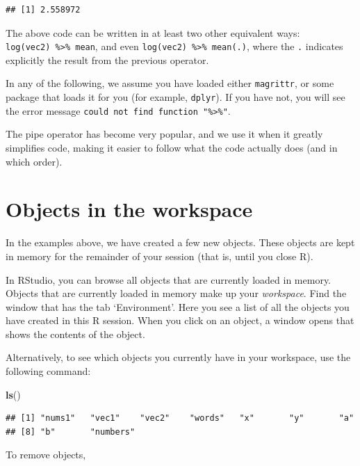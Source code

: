 \documentclass[]{book}
\newenvironment{Shaded}{\begin{snugshade}}{\end{snugshade}}
\newcommand{\KeywordTok}[1]{\textcolor[rgb]{0.13,0.29,0.53}{\textbf{#1}}}
\newcommand{\NormalTok}[1]{#1}
\begin{document}
\begin{verbatim}
## [1] 2.558972
\end{verbatim}

The above code can be written in at least two other equivalent ways: \texttt{log(vec2)\ \%\textgreater{}\%\ mean}, and even \texttt{log(vec2)\ \%\textgreater{}\%\ mean(.)}, where the \texttt{.} indicates explicitly the result from the previous operator.

In any of the following, we assume you have loaded either \texttt{magrittr}, or some package that loads it for you (for example, \texttt{dplyr}). If you have not, you will see the error message \texttt{could\ not\ find\ function\ "\%\textgreater{}\%"}.

The pipe operator has become very popular, and we use it when it greatly simplifies code, making it easier to follow what the code actually does (and in which order).

\hypertarget{objects-in-the-workspace}{%
\section{Objects in the workspace}\label{objects-in-the-workspace}}

In the examples above, we have created a few new objects. These objects are kept in memory for the remainder of your session (that is, until you close R).

In RStudio, you can browse all objects that are currently loaded in memory. Objects that are currently loaded in memory make up your \emph{workspace}. Find the window that has the tab `Environment'. Here you see a list of all the objects you have created in this R session. When you click on an object, a window opens that shows the contents of the object.

Alternatively, to see which objects you currently have in your workspace, use the following command:

\begin{Shaded}
\begin{Highlighting}[]
\KeywordTok{ls}\NormalTok{()}
\end{Highlighting}
\end{Shaded}

\begin{verbatim}
## [1] "nums1"   "vec1"    "vec2"    "words"   "x"       "y"       "a"      
## [8] "b"       "numbers"
\end{verbatim}

To remove objects,
\end{document}

